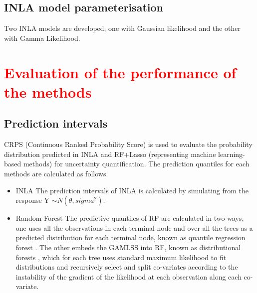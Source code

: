 \documentclass{article}
\begin{document}
\subsection{INLA model parameterisation}
 Two INLA models are developed, one with Gaussian likelihood and the other with Gamma Likelihood. 

\section{\textcolor{red}{Evaluation of the performance of the methods}}

\subsection {Prediction intervals}

CRPS (Continuous Ranked Probability Score) \citep{jordan2017evaluating} is used to evaluate the probability distribution predicted in INLA and RF+Lasso (representing machine learning-based methods) for uncertainty quantification. The prediction quantiles for each methods are calculated as follows. %
\begin{itemize}
     
\item INLA
The prediction intervals of INLA is calculated by simulating from the response Y $\sim N(\theta, sigma^2)$.  


\item Random Forest 
 The predictive quantiles of RF are calculated in two ways, one uses all the observations in each terminal node and over all the trees as a predicted distribution for each terminal node, known as quantile regression forest \citep{meinshausen2006quantile}. The other embeds the GAMLSS \citep{stasinopoulos2007generalized} into RF, known as distributional forests \citep{schlosser2019distributional}, which for each tree uses standard maximum likelihood to fit distributions and recursively select and split co-variates according to the instability of the gradient of the likelihood at each observation along each co-variate. 
 
\end{itemize}
 
\end{document}
